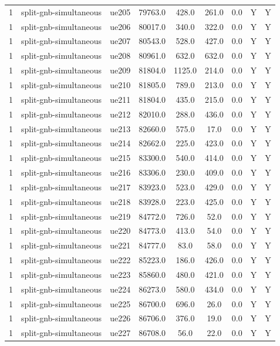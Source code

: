 \begin{table}[ht]
\begin{tabular}{|c|c|c|c|c|c|c|c|c|}
1 & split-gnb-simultaneous & ue205 & 79763.0 & 428.0 & 261.0 & 0.0 & Y & Y \\
1 & split-gnb-simultaneous & ue206 & 80017.0 & 340.0 & 322.0 & 0.0 & Y & Y \\
1 & split-gnb-simultaneous & ue207 & 80543.0 & 528.0 & 427.0 & 0.0 & Y & Y \\
1 & split-gnb-simultaneous & ue208 & 80961.0 & 632.0 & 632.0 & 0.0 & Y & Y \\
1 & split-gnb-simultaneous & ue209 & 81804.0 & 1125.0 & 214.0 & 0.0 & Y & Y \\
1 & split-gnb-simultaneous & ue210 & 81805.0 & 789.0 & 213.0 & 0.0 & Y & Y \\
1 & split-gnb-simultaneous & ue211 & 81804.0 & 435.0 & 215.0 & 0.0 & Y & Y \\
1 & split-gnb-simultaneous & ue212 & 82010.0 & 288.0 & 436.0 & 0.0 & Y & Y \\
1 & split-gnb-simultaneous & ue213 & 82660.0 & 575.0 & 17.0 & 0.0 & Y & Y \\
1 & split-gnb-simultaneous & ue214 & 82662.0 & 225.0 & 423.0 & 0.0 & Y & Y \\
1 & split-gnb-simultaneous & ue215 & 83300.0 & 540.0 & 414.0 & 0.0 & Y & Y \\
1 & split-gnb-simultaneous & ue216 & 83306.0 & 230.0 & 409.0 & 0.0 & Y & Y \\
1 & split-gnb-simultaneous & ue217 & 83923.0 & 523.0 & 429.0 & 0.0 & Y & Y \\
1 & split-gnb-simultaneous & ue218 & 83928.0 & 223.0 & 425.0 & 0.0 & Y & Y \\
1 & split-gnb-simultaneous & ue219 & 84772.0 & 726.0 & 52.0 & 0.0 & Y & Y \\
1 & split-gnb-simultaneous & ue220 & 84773.0 & 413.0 & 54.0 & 0.0 & Y & Y \\
1 & split-gnb-simultaneous & ue221 & 84777.0 & 83.0 & 58.0 & 0.0 & Y & Y \\
1 & split-gnb-simultaneous & ue222 & 85223.0 & 186.0 & 426.0 & 0.0 & Y & Y \\
1 & split-gnb-simultaneous & ue223 & 85860.0 & 480.0 & 421.0 & 0.0 & Y & Y \\
1 & split-gnb-simultaneous & ue224 & 86273.0 & 580.0 & 434.0 & 0.0 & Y & Y \\
1 & split-gnb-simultaneous & ue225 & 86700.0 & 696.0 & 26.0 & 0.0 & Y & Y \\
1 & split-gnb-simultaneous & ue226 & 86706.0 & 376.0 & 19.0 & 0.0 & Y & Y \\
1 & split-gnb-simultaneous & ue227 & 86708.0 & 56.0 & 22.0 & 0.0 & Y & Y \\

\end{tabular}
\end{table}
